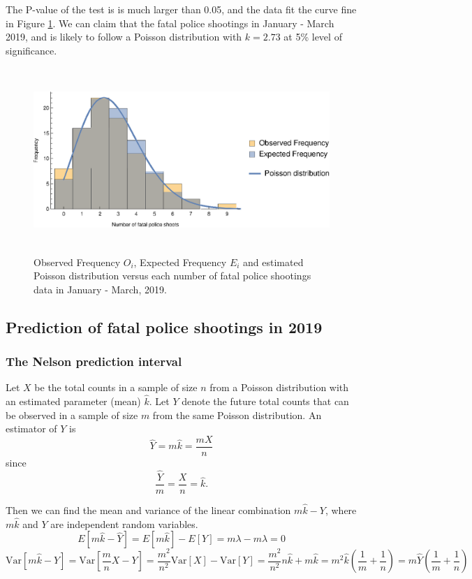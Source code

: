 \documentclass[conf]{new-aiaa}
\begin{document}
The P-value of the test is is much larger than 0.05, and the data fit the curve fine in Figure \ref{fig:q6}. We can claim that the fatal police shootings in January - March 2019, and is likely to follow a Poisson distribution with $k=2.73$ at 5\% level of significance.

\begin{figure}[!htbp]
\centering
\includegraphics[height=7cm]{q6/q6.eps}
\caption{Observed Frequency $O_i$, Expected Frequency $E_i$ and estimated Poisson distribution versus each number of fatal police shootings data in January - March, 2019.}
\label{fig:q6}
\end{figure}

\newpage

\subsection{Prediction of fatal police shootings in 2019}

\subsubsection{The Nelson prediction interval\cite{KRISHNAMOORTHY20111709}}

Let $X$ be the total counts in a sample of size $n$ from a Poisson distribution with an estimated parameter (mean) $\hat{k}$. Let $Y$
denote the future total counts that can be observed in a sample of size  $m$ from the same Poisson distribution. An estimator of $Y$ is
\begin{equation}
\hat{Y}=m\hat{k}=\frac{mX}{n}
\end{equation}
since $$\frac{\hat{Y}}{m}=\frac{X}{n}=\hat{k}.$$

Then we can find the mean and variance of the linear combination $m\hat{k}-Y$, where $m\hat{k}$ and $Y$ are independent random variables.
\begin{equation}
E[m\hat{k}-\hat{Y}]=E[m\hat{k}]-E[Y]=m\lambda-m\lambda=0
\end{equation}
\begin{equation}
\text{Var}[m\hat{k}-Y]=\text{Var}\left[\frac{m}{n}X-Y\right]=\frac{m^2}{n^2}\text{Var}[X]-\text{Var}[Y]=\frac{m^2}{n^2}n\hat{k}+m\hat{k}=m^2\hat{k}\left(\frac{1}{m}+\frac{1}{n}\right)=m\hat{Y}\left(\frac{1}{m}+\frac{1}{n}\right)
\end{equation}
\end{document}
